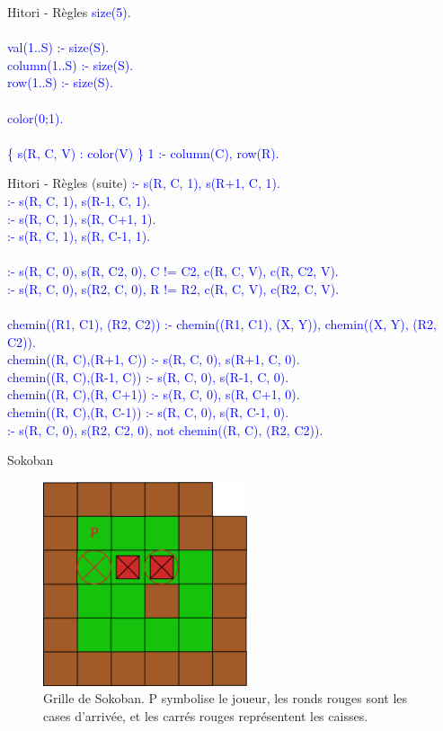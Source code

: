 \documentclass{beamer}
\begin{document}
\begin{frame}{Hitori - Règles}
	\textcolor{blue}{
	\pause
	size(5).\\
	\textcolor{white}{cheatcode}\\
	val(1..S) :- size(S).\\
	column(1..S) :- size(S).\\
	row(1..S) :- size(S).\\
	\textcolor{white}{cheatcode}\\
	\pause
	color(0;1).\\
	\textcolor{white}{cheatcode}\\
	 \{ s(R, C, V) : color(V) \} 1 :- column(C), row(R).}\\
\end{frame}

\begin{frame}{Hitori - Règles (suite)}
	\textcolor{blue}{:- s(R, C, 1), s(R+1, C, 1).\\
	:- s(R, C, 1), s(R-1, C, 1).\\
	:- s(R, C, 1), s(R, C+1, 1).\\
	:- s(R, C, 1), s(R, C-1, 1).\\
	\textcolor{white}{cheatcode}\\
	\pause
	:- s(R, C, 0), s(R, C2, 0), C != C2, c(R, C, V), c(R, C2, V).\\
	:- s(R, C, 0), s(R2, C, 0), R != R2, c(R, C, V), c(R2, C, V).\\
	\textcolor{white}{cheatcode}\\
	\pause
	chemin((R1, C1), (R2, C2)) :- chemin((R1, C1), (X, Y)), chemin((X, Y), (R2, C2)).\\
	chemin((R, C),(R+1, C)) :- s(R, C, 0), s(R+1, C, 0).\\
	chemin((R, C),(R-1, C)) :- s(R, C, 0), s(R-1, C, 0).\\
	chemin((R, C),(R, C+1)) :- s(R, C, 0), s(R, C+1, 0).\\
	chemin((R, C),(R, C-1)) :- s(R, C, 0), s(R, C-1, 0).\\
	:- s(R, C, 0), s(R2, C2, 0), not chemin((R, C), (R2, C2)).}\\
\end{frame}

\begin{frame}{Sokoban}
	\begin{figure}[!h]
		\includegraphics[width=6cm]{Diagram1.eps}
		\caption{Grille de Sokoban. P symbolise le joueur, les ronds rouges sont les cases d'arrivée, et les carrés rouges représentent les caisses.}
		\label{label-figure3}
	\end{figure}
\end{frame}
\end{document}
